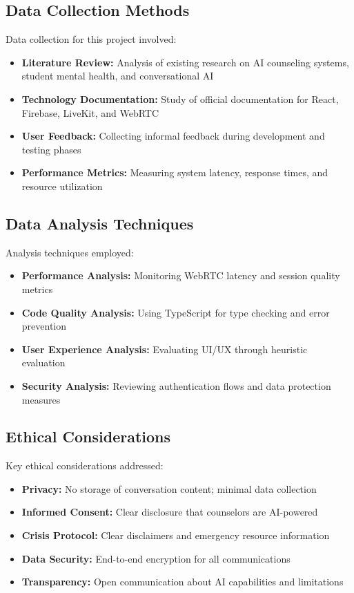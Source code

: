 \documentclass[11pt,a4paper]{article}
\begin{document}
\subsection{Data Collection Methods}
Data collection for this project involved:

\begin{itemize}
    \item \textbf{Literature Review:} Analysis of existing research on AI counseling systems, student mental health, and conversational AI
    \item \textbf{Technology Documentation:} Study of official documentation for React, Firebase, LiveKit, and WebRTC
    \item \textbf{User Feedback:} Collecting informal feedback during development and testing phases
    \item \textbf{Performance Metrics:} Measuring system latency, response times, and resource utilization
\end{itemize}

\subsection{Data Analysis Techniques}
Analysis techniques employed:

\begin{itemize}
    \item \textbf{Performance Analysis:} Monitoring WebRTC latency and session quality metrics
    \item \textbf{Code Quality Analysis:} Using TypeScript for type checking and error prevention
    \item \textbf{User Experience Analysis:} Evaluating UI/UX through heuristic evaluation
    \item \textbf{Security Analysis:} Reviewing authentication flows and data protection measures
\end{itemize}

\subsection{Ethical Considerations}
Key ethical considerations addressed:

\begin{itemize}
    \item \textbf{Privacy:} No storage of conversation content; minimal data collection
    \item \textbf{Informed Consent:} Clear disclosure that counselors are AI-powered
    \item \textbf{Crisis Protocol:} Clear disclaimers and emergency resource information
    \item \textbf{Data Security:} End-to-end encryption for all communications
    \item \textbf{Transparency:} Open communication about AI capabilities and limitations
\end{itemize}
\end{document}
